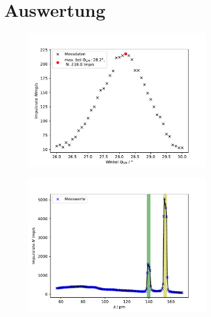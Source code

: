\newpage
\section{Auswertung}
\begin{figure}[H]
    \centering
    \includegraphics[width=0.7\textwidth]{plots/messdaten1.pdf}
    \caption{}
\end{figure}
\begin{figure}[H]
    \centering
    \includegraphics[width=0.7\textwidth]{plots/spektrum.pdf}
    \caption{}
\end{figure}


\label{sec:Auswertung}
